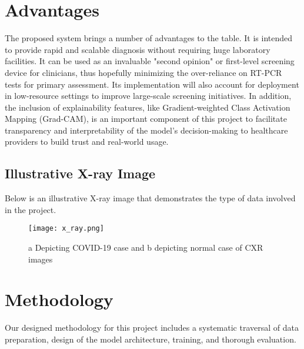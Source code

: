 \documentclass[10pt, a4paper]{article}
\begin{document}
\section*{Advantages}
The proposed system brings a number of advantages to the table. It is intended to provide rapid and scalable diagnosis without requiring huge laboratory facilities. It can be used as an invaluable "second opinion" or first-level screening device for clinicians, thus hopefully minimizing the over-reliance on RT-PCR tests for primary assessment. Its implementation will also account for deployment in low-resource settings to improve large-scale screening initiatives. In addition, the inclusion of explainability features, like Gradient-weighted Class Activation Mapping (Grad-CAM), is an important component of this project to facilitate transparency and interpretability of the model's decision-making to healthcare providers to build trust and real-world usage.

\subsection*{Illustrative X-ray Image}
Below is an illustrative X-ray image that demonstrates the type of data involved in the project.

\begin{figure}[h!]
    \centering
    \texttt{[image: x\_ray.png]} %
    \caption{a Depicting COVID-19 case and b depicting normal case of CXR images} %
    \label{fig:xray}
\end{figure}

\section*{Methodology}
Our designed methodology for this project includes a systematic traversal of data preparation, design of the model architecture, training, and thorough evaluation.

\end{document}

